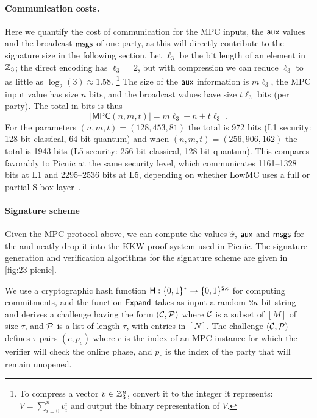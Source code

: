 \paragraph{Communication costs.}
Here we quantify the cost of communication for the MPC inputs, the $\textsf{aux}$ values and the broadcast $\textsf{msgs}$ of one party,
as this will directly contribute to the signature size in the following section. 
Let $\ell_3$ be the bit length of an element in $\mathbb{Z}_3$; the direct encoding has
$\ell_3 = 2$, but with compression we can reduce $\ell_3$ to as little as
$\log_2(3) \approx 1.58$. \footnote{To compress a vector $v\in\mathbb{Z}_3^{n}$, convert it to the integer it represents: $V = \sum_{i=0}^n v_i^{i}$
and output the binary representation of $V$. }   The size of the
$\textsf{aux}$ information is $m\ell_3$, the MPC input value has size $n$ bits, 
and the broadcast values have size $t\ell_3$ bits (per party). 
The total in bits is thus 
\begin{equation} \label{eqn:sizeMPC}
|\textsf{MPC}(n,m,t)| = m\ell_3 + n + t\ell_3\;.
\end{equation}
For the parameters 
$(n,m,t)=(128, 453, 81)$ the total is 972 bits (L1 security: 128-bit classical, 64-bit quantum)
and when $(n,m,t) = (256, 906, 162)$ the total is 1943 bits (L5 security: 256-bit classical, 128-bit quantum).  This compares favorably to
Picnic at the same security level, which communicates 1161--1328 bits at L1
and 2295--2536 bits at L5, depending on whether LowMC uses a full or partial S-box layer~\cite{kales2020-picnic}.

\paragraph{Signature scheme}
Given the MPC protocol above, we can compute the values $\hat{x}$, $\textsf{aux}$ and
$\textsf{msgs}$ for the \ttOWF and neatly drop it into the KKW proof system used in
Picnic.  The signature generation and verification algorithms for the
\ttOWF  signature scheme are given in \cref{fig:23-picnic}.


We use a cryptographic hash function $\textsf{H}: \{0,1\}^*\to \{0,1\}^{2\kappa}$
for computing commitments, and the function $\textsf{Expand}$ takes as input a random $2\kappa$-bit string
and derives a challenge having the form $(\mathcal{C}, \mathcal{P})$ where $\mathcal{C}$ is a subset of $[M]$
of size $\tau$, and $\mathcal{P}$ is a list of length $\tau$, with entries in $[N]$. 
The challenge $(\mathcal{C}, \mathcal{P})$ defines $\tau$ pairs $(c,p_c)$ where $c$ is the
index of  an MPC instance for which the verifier will check the online phase,
and $p_c$ is the index of the party that will remain unopened. 


